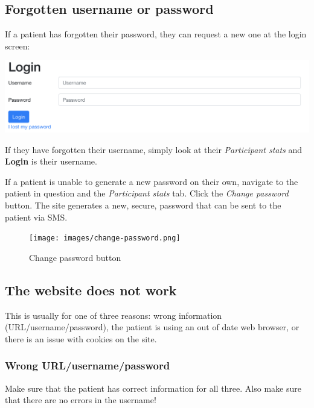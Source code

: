 \documentclass[]{book}
\theoremstyle{definition}
\theoremstyle{definition}
\theoremstyle{definition}
\theoremstyle{remark}
\begin{document}
\hypertarget{forgotten-username-or-password}{%
\subsection{Forgotten username or
password}\label{forgotten-username-or-password}}

If a patient has forgotten their password, they can request a new one at
the login screen:

\includegraphics{images/patient-login.png}

If they have forgotten their username, simply look at their
\emph{Participant stats} and \textbf{Login} is their username.

If a patient is unable to generate a new password on their own, navigate
to the patient in question and the \emph{Participant stats} tab. Click
the \emph{Change password} button. The site generates a new, secure,
password that can be sent to the patient via SMS.

\begin{figure}
\centering
\texttt{[image: images/change-password.png]}
\caption{Change password button}
\end{figure}

\hypertarget{the-website-does-not-work}{%
\subsection{The website does not work}\label{the-website-does-not-work}}

This is usually for one of three reasons: wrong information
(URL/username/password), the patient is using an out of date web
browser, or there is an issue with cookies on the site.

\hypertarget{wrong-urlusernamepassword}{%
\subsubsection{Wrong
URL/username/password}\label{wrong-urlusernamepassword}}

Make sure that the patient has correct information for all three. Also
make sure that there are no errors in the username!
\end{document}
